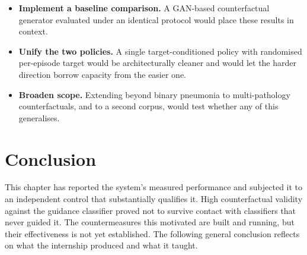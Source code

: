 \begin{itemize}[leftmargin=*]
        lever on FID precision.
  \item \textbf{Implement a baseline comparison.} A GAN-based
        counterfactual generator evaluated under an identical protocol
        would place these results in context.
  \item \textbf{Unify the two policies.} A single target-conditioned
        policy with randomised per-episode target would be
        architecturally cleaner and would let the harder \ntop{}
        direction borrow capacity from the easier one.
  \item \textbf{Broaden scope.} Extending beyond binary pneumonia to
        multi-pathology counterfactuals, and to a second corpus, would
        test whether any of this generalises.
\end{itemize}

\section{Conclusion}

This chapter has reported the system's measured performance and
subjected it to an independent control that substantially qualifies it.
High counterfactual validity against the guidance classifier proved not
to survive contact with classifiers that never guided it. The
countermeasures this motivated are built and running, but their
effectiveness is not yet established. The following general conclusion
reflects on what the internship produced and what it taught.
